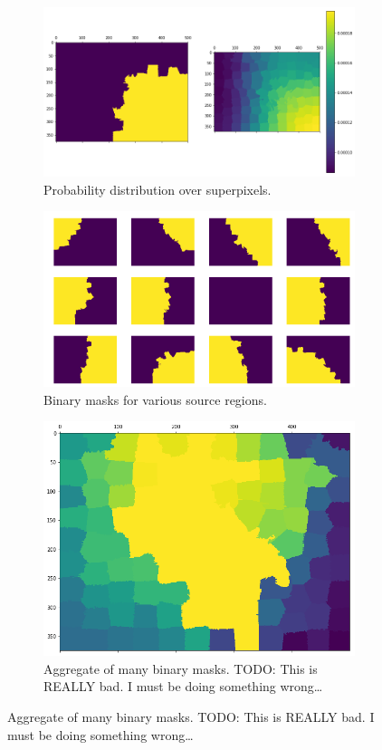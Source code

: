 \documentclass[twocolumn]{article}
\newcommand{\todo}[1]{}
\renewcommand{\todo}[1]{{\color{red} TODO: {#1}}}
\begin{document}
\begin{figure}
  \centering

  \begin{subfigure}{\linewidth}
    \includegraphics[width=\linewidth]{figs/single_source.png}
    \caption{Probability distribution over superpixels.}
  \end{subfigure}
  \begin{subfigure}{\linewidth}
    \includegraphics[width=\linewidth]{figs/many_sources.png}
    \caption{Binary masks for various source regions.}
  \end{subfigure}
  \begin{subfigure}{\linewidth}
    \includegraphics[width=\linewidth]{figs/aggregate.png}
    \caption{Aggregate of many binary masks. \todo{This is REALLY bad. I must be doing something wrong\ldots}}
  \end{subfigure}


\end{figure}
\end{document}
